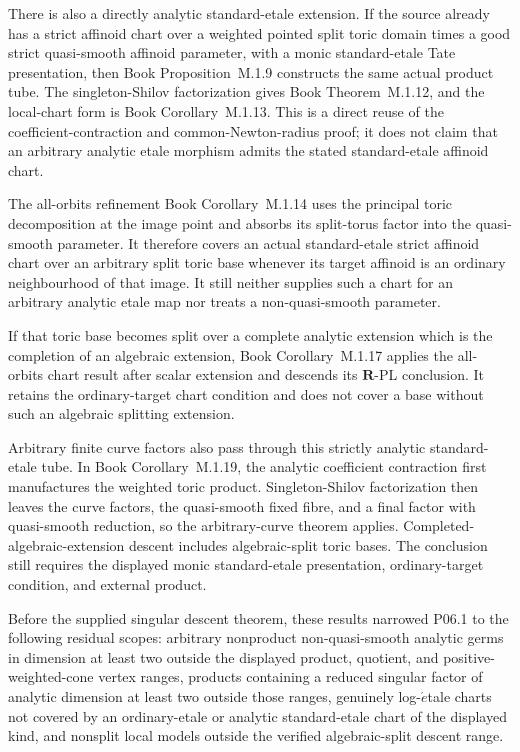 \documentclass[11pt,a4paper]{article}
\theoremstyle{definition}
\theoremstyle{remark}
\begin{document}
There is also a directly analytic standard-etale extension.  If the source
already has a strict affinoid chart over a weighted pointed split toric
domain times a good strict quasi-smooth affinoid parameter, with a monic
standard-etale Tate presentation, then
Book Proposition~M.1.9 constructs the same
actual product tube.  The singleton-Shilov factorization gives
Book Theorem~M.1.12, and the local-chart
form is Book Corollary~M.1.13.  This is a
direct reuse of the coefficient-contraction and common-Newton-radius proof;
it does not claim that an arbitrary analytic etale morphism admits the
stated standard-etale affinoid chart.

The all-orbits refinement Book Corollary~M.1.14
uses the principal toric decomposition at the image point and absorbs its
split-torus factor into the quasi-smooth parameter.  It therefore covers an
actual standard-etale strict affinoid chart over an arbitrary split toric
base whenever its target affinoid is an ordinary neighbourhood of that
image.  It still neither supplies such a chart for an arbitrary analytic
etale map nor treats a non-quasi-smooth parameter.

If that toric base becomes split over a complete analytic extension which is
the completion of an algebraic extension,
Book Corollary~M.1.17 applies the
all-orbits chart result after scalar extension and descends its
\(\mathbf R\)-PL conclusion.  It retains the ordinary-target chart
condition and does not cover a base without such an algebraic splitting
extension.

Arbitrary finite curve factors also pass through this strictly analytic
standard-etale tube.  In
Book Corollary~M.1.19,
the analytic coefficient contraction first manufactures the weighted toric
product.  Singleton-Shilov factorization then leaves the curve factors, the
quasi-smooth fixed fibre, and a final factor with quasi-smooth reduction, so
the arbitrary-curve theorem applies.  Completed-algebraic-extension descent
includes algebraic-split toric bases.  The conclusion still requires the
displayed monic standard-etale presentation, ordinary-target condition, and
external product.

Before the supplied singular descent theorem, these results narrowed
P06.1 to the following residual scopes:
arbitrary nonproduct non-quasi-smooth analytic germs in dimension at least
two outside the displayed product, quotient, and positive-weighted-cone
vertex ranges, products containing a reduced singular factor of analytic
dimension at least two outside those ranges, genuinely log-\(\acute{e}\)tale charts not covered by an
ordinary-etale or analytic standard-etale chart of the displayed kind, and
nonsplit local models outside the verified algebraic-split descent range.
\end{document}
